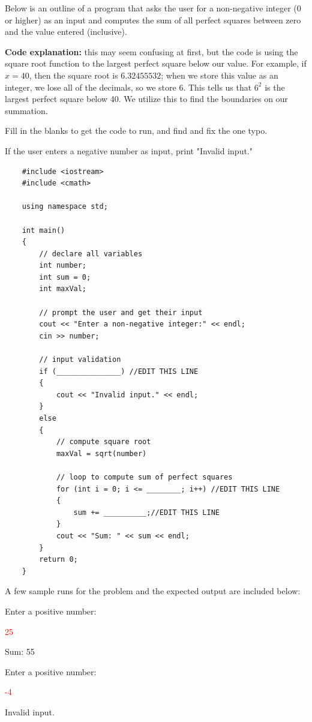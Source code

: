 \begin{problem}
Below is an outline of a program that asks the user for a non-negative integer (0 or higher) as an input and computes the sum of all perfect squares between zero and the value entered (inclusive). 

\textbf{Code explanation:} this may seem confusing at first, but the code is using the square root function to the largest perfect square below our value. For example, if $x=40$, then the square root is $6.32455532$; when we store this value as an integer, we lose all of the decimals, so we store 6. This tells us that $6^2$ is the largest perfect square below 40. We utilize this to find the boundaries on our summation.

Fill in the blanks to get the code to run, and find and fix the one typo.

If the user enters a negative number as input, print "Invalid input."


\begin{verbatim}
    #include <iostream>
    #include <cmath>
    
    using namespace std;
    
    int main()
    {
        // declare all variables
        int number;
        int sum = 0;
        int maxVal;
        
        // prompt the user and get their input
        cout << "Enter a non-negative integer:" << endl;
        cin >> number;
        
        // input validation
        if (_______________) //EDIT THIS LINE
        { 
            cout << "Invalid input." << endl;
        }
        else
        {
            // compute square root
        	maxVal = sqrt(number)
        	
        	// loop to compute sum of perfect squares
            for (int i = 0; i <= ________; i++) //EDIT THIS LINE
            {
                sum += __________;//EDIT THIS LINE
            }
            cout << "Sum: " << sum << endl;
        }
        return 0;
    }
\end{verbatim}

A few sample runs for the problem and the expected output are included below:

\begin{sample}
Enter a positive number:
    
\textcolor{red}{25}

Sum: 55
\end{sample}

\begin{sample}
Enter a positive number:
    
\textcolor{red}{-4}

Invalid input.
\end{sample}
\end{problem}

